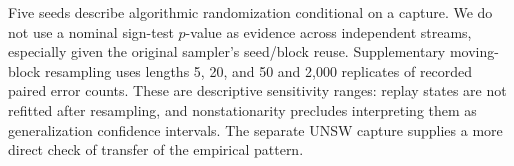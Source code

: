 Five seeds describe algorithmic randomization conditional on a capture. We do not use a nominal sign-test $p$-value as evidence across independent streams, especially given the original sampler's seed/block reuse. Supplementary moving-block resampling uses lengths 5, 20, and 50 and 2,000 replicates of recorded paired error counts. These are descriptive sensitivity ranges: replay states are not refitted after resampling, and nonstationarity precludes interpreting them as generalization confidence intervals. The separate UNSW capture supplies a more direct check of transfer of the empirical pattern.

